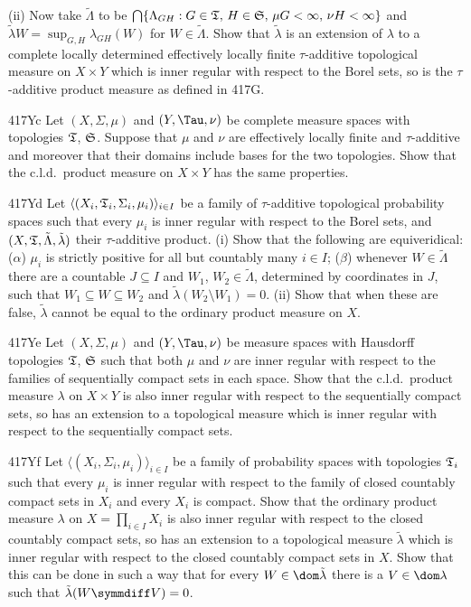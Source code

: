 {\quad(ii) Now take $\tilde\Lambda$ to be
$\bigcap\{\Lambda_{GH}:G\in\frak T,\,
H\in\frak S,\,\mu G<\infty,\,\nu H<\infty\}$ and
$\tilde\lambda W=\sup_{G,H}\lambda_{GH}(W)$ for $W\in\tilde\Lambda$.
Show that $\tilde\lambda$ is an extension of $\lambda$ to a complete
locally determined effectively locally finite $\tau$-additive
topological measure on
$X\times Y$ which is inner regular with respect to the Borel sets, so is
the $\tau$-additive product measure as defined in 417G.

\spheader 417Yc Let $(X,\Sigma,\mu)$ and $(Y,\Tau,\nu)$ be complete
measure spaces with topologies $\frak T$, $\frak S$.   Suppose that
$\mu$ and $\nu$
are effectively locally finite and $\tau$-additive and moreover that
their domains include bases for the two topologies.   Show that the
c.l.d.\ product measure on $X\times Y$ has the same properties.

\spheader 417Yd Let $\langle(X_i,\frak T_i,\Sigma_i,\mu_i)\rangle_{i\in
I}$ be a family of $\tau$-additive topological probability spaces such
that every $\mu_i$ is inner regular with respect to the Borel sets, and
$(X,\frak T,\tilde\Lambda,\tilde\lambda)$ their $\tau$-additive product.
(i) Show that the following are equiveridical:  ($\alpha$) $\mu_i$ is
strictly positive
for all but countably many $i\in I$;  ($\beta$) whenever
$W\in\tilde\Lambda$
there are a countable $J\subseteq I$ and $W_1$, $W_2\in\tilde\Lambda$,
determined by coordinates in $J$, such that $W_1\subseteq W\subseteq
W_2$ and $\tilde\lambda(W_2\setminus W_1)=0$.   (ii) Show that when
these are false, $\tilde\lambda$ cannot be equal to the ordinary product
measure on $X$.

\spheader 417Ye Let $(X,\Sigma,\mu)$ and $(Y,\Tau,\nu)$ be measure
spaces with Hausdorff topologies $\frak T$, $\frak S$ such that both $\mu$ and
$\nu$ are inner regular with respect to the families of sequentially
compact sets in
each space.   Show that the c.l.d.\ product measure $\lambda$ on
$X\times Y$ is also inner regular with respect to the sequentially
compact sets, so has an extension to a topological measure which is
inner regular with respect to the sequentially compact sets.

\spheader 417Yf Let $\langle(X_i,\Sigma_i,\mu_i)\rangle_{i\in I}$ be a
family of probability spaces with topologies $\frak T_i$ such that every
$\mu_i$ is inner regular with respect to the family of closed countably
compact sets in $X_i$ and every $X_i$ is compact.   Show that the
ordinary product measure $\lambda$ on $X=\prod_{i\in I}X_i$ is also
inner regular with respect to the closed countably compact sets, so has
an extension to a topological measure $\tilde\lambda$ which is inner
regular with respect to the closed countably compact sets in $X$.   Show
that this can be done in such a way that for every
$W\in\dom\tilde\lambda$ there is a $V\in\dom\lambda$ such that
$\tilde\lambda(W\symmdiff V)=0$.

}
